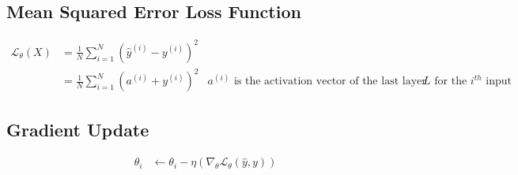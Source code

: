 \documentclass{article}
\begin{document}
\subsection{Mean Squared Error Loss Function}
\begin{equation}
	\begin{aligned}
		\mathcal{L}_\theta(X) & =
		\frac{1}{N} \sum_{i=1}^{N}{ (\hat{y}^{(i)} - y^{(i)} )^{2}}                                                                                                            \\
		                      & = \frac{1}{N} \sum_{i=1}^{N}{(a^{(i)} + y^{(i)})^{2}} & \text{$a^{(i)}$ is the activation vector of the last layer $L$ for the $i^{th}$ input}
	\end{aligned}
\end{equation}

\subsection{Gradient Update}
\begin{align}
	\theta_i & \gets \theta_i - \eta (\nabla_\theta \mathcal{L}_{\theta}(\hat{y}, y))
\end{align}
\end{document}
